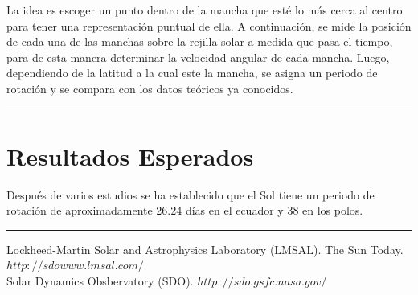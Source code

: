 \documentclass[11pt,letterpaper]{article}
\begin{document}
La idea es escoger un punto dentro de la mancha que esté lo más cerca al centro para tener una representación puntual de ella. A continuación, se mide la posición de cada una de las manchas sobre la rejilla solar a medida que pasa el tiempo, para de esta manera determinar la velocidad angular de cada mancha. Luego, dependiendo de la latitud a la cual este la mancha, se asigna un periodo de rotación y se compara con los datos teóricos ya conocidos. 
\\
 
\hrule

\section{Resultados Esperados}

Después de varios estudios se ha establecido que el Sol tiene un periodo de rotación de aproximadamente 26.24 días en el ecuador y 38 en los polos.
\\

\hrule





Lockheed-Martin Solar and Astrophysics Laboratory (LMSAL). The Sun Today.  \href{http://sdowww.lmsal.com/}{$http://sdowww.lmsal.com/$}
\\

Solar Dynamics Obsbervatory (SDO). \href{http://sdo.gsfc.nasa.gov/}{$http://sdo.gsfc.nasa.gov/$}
\\
\end{document}
